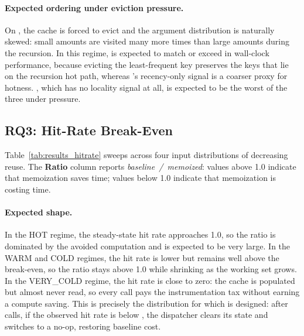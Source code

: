 \paragraph{Expected ordering under eviction pressure.} On , the cache is forced to evict and the argument distribution is naturally skewed: small amounts are visited many more times than large amounts during the recursion. In this regime, \lfu is expected to match or exceed \lru in wall-clock performance, because evicting the least-frequent key preserves the keys that lie on the recursion hot path, whereas \lru's recency-only signal is a coarser proxy for hotness. \fifo, which has no locality signal at all, is expected to be the worst of the three under pressure.


\subsection{RQ3: Hit-Rate Break-Even}\label{sec:results_rq3}



Table~\ref{tab:results_hitrate} sweeps  across four input distributions of decreasing reuse. The \textbf{Ratio} column reports \emph{baseline~/~memoized}: values above 1.0 indicate that memoization saves time; values below 1.0 indicate that memoization is costing time.

\paragraph{Expected shape.} In the HOT regime, the steady-state hit rate approaches 1.0, so the ratio is dominated by the avoided computation and is expected to be very large. In the WARM and COLD regimes, the hit rate is lower but remains well above the break-even, so the ratio stays above 1.0 while shrinking as the working set grows. In the VERY\_COLD regime, the hit rate is close to zero: the cache is populated but almost never read, so every call pays the instrumentation tax without earning a compute saving. This is precisely the distribution for which  is designed: after  calls, if the observed hit rate is below , the dispatcher clears its state and switches to a no-op, restoring baseline cost.

